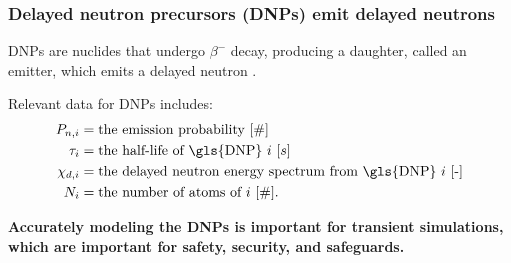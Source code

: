 \begin{frame}
  \frametitle{Delayed neutron precursors (DNPs) emit delayed neutrons}
        \Glspl{DNP} are nuclides that undergo $\beta^-$ decay, producing a daughter, called an emitter, which emits a delayed neutron \cite{bank2000jef}.

        \begin{block}{Relevant data for \glspl{DNP} includes:}
            \[
            \begin{aligned}
                P_{n, i} &= \text{the emission probability [$\#$]} \\
                \tau_i &= \text{the half-life of \gls{DNP} $i$ [$s$]} \\
                \chi_{d, i} &= \text{the delayed neutron energy spectrum from \gls{DNP} $i$ [-]} \\
                N_i &= \text{the number of atoms of $i$ [$\#$]}.
            \end{aligned}
            \]
        \end{block}
        \textbf{Accurately modeling the \glspl{DNP} is important for transient simulations, which are important for safety, security, and safeguards.}
\end{frame}